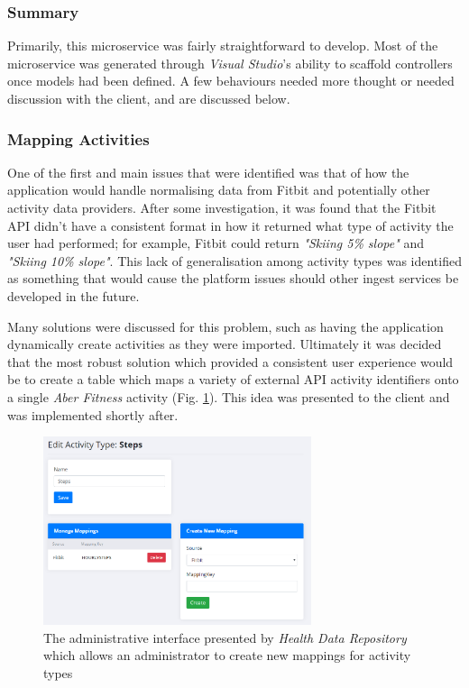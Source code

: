 \subsubsection{Summary}
Primarily, this microservice was fairly straightforward to develop. Most of the microservice was generated through \textit{Visual Studio}'s ability to scaffold controllers once models had been defined. A few behaviours needed more thought or needed discussion with the client, and are discussed below.

\subsubsection{Mapping Activities}

One of the first and main issues that were identified was that of how the application would handle normalising data from Fitbit and potentially other activity data providers. After some investigation, it was found that the Fitbit API didn't have a consistent format in how it returned what type of activity the user had performed; for example, Fitbit could return \textit{"Skiing 5\% slope"} and \textit{"Skiing 10\% slope"}. This lack of generalisation among activity types was identified as something that would cause the platform issues should other ingest services be developed in the future. 

Many solutions were discussed for this problem, such as having the application dynamically create activities as they were imported. Ultimately it was decided that the most robust solution which provided a consistent user experience would be to create a table which maps a variety of external API activity identifiers onto a single \textit{Aber Fitness} activity (Fig. \ref{fig:health_mappings}). This idea was presented to the client and was implemented shortly after.

\begin{figure}[H]
    \centering
    \includegraphics[width=0.7\textwidth]{Images/Chpt5_HealthData_Mapping.png}
    \caption{The administrative interface presented by \textit{Health Data Repository} which allows an administrator to create new mappings for activity types}
    \label{fig:health_mappings}
\end{figure}

